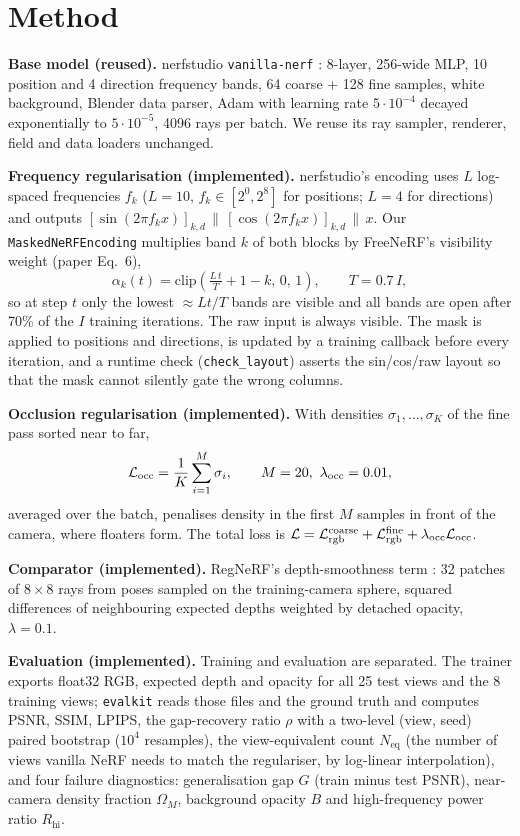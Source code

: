 \section{Method}
\textbf{Base model (reused).} nerfstudio \texttt{vanilla-nerf} \cite{tancik2023nerfstudio}: 8-layer, 256-wide MLP, 10 position and 4 direction frequency bands, 64 coarse + 128 fine samples, white background, Blender data parser, Adam with learning rate $5\cdot10^{-4}$ decayed exponentially to $5\cdot10^{-5}$, 4096 rays per batch. We reuse its ray sampler, renderer, field and data loaders unchanged.

\textbf{Frequency regularisation (implemented).} nerfstudio's encoding uses $L$ log-spaced frequencies $f_k$ ($L=10$, $f_k\in[2^0,2^8]$ for positions; $L=4$ for directions) and outputs $[\sin(2\pi f_k x)]_{k,d}\,\|\,[\cos(2\pi f_k x)]_{k,d}\,\|\,x$. Our \texttt{MaskedNeRFEncoding} multiplies band $k$ of both blocks by FreeNeRF's visibility weight (paper Eq.~6),
\begin{equation}
\alpha_k(t)=\mathrm{clip}\!\left(\tfrac{L\,t}{T}+1-k,\,0,\,1\right),\qquad T=0.7\,I,
\end{equation}
so at step $t$ only the lowest $\approx Lt/T$ bands are visible and all bands are open after 70\% of the $I$ training iterations. The raw input is always visible. The mask is applied to positions and directions, is updated by a training callback before every iteration, and a runtime check (\texttt{check\_layout}) asserts the sin/cos/raw layout so that the mask cannot silently gate the wrong columns.

\textbf{Occlusion regularisation (implemented).} With densities $\sigma_1,\dots,\sigma_K$ of the fine pass sorted near to far,
\begin{equation}
\mathcal{L}_\text{occ}=\frac{1}{K}\sum_{i=1}^{M}\sigma_i ,\qquad M=20,\ \lambda_\text{occ}=0.01,
\end{equation}
averaged over the batch, penalises density in the first $M$ samples in front of the camera, where floaters form. The total loss is $\mathcal{L}=\mathcal{L}_\text{rgb}^\text{coarse}+\mathcal{L}_\text{rgb}^\text{fine}+\lambda_\text{occ}\mathcal{L}_\text{occ}$.

\textbf{Comparator (implemented).} RegNeRF's depth-smoothness term \cite{niemeyer2022regnerf}: 32 patches of $8\times8$ rays from poses sampled on the training-camera sphere, squared differences of neighbouring expected depths weighted by detached opacity, $\lambda=0.1$.

\textbf{Evaluation (implemented).} Training and evaluation are separated. The trainer exports float32 RGB, expected depth and opacity for all 25 test views and the 8 training views; \texttt{evalkit} reads those files and the ground truth and computes PSNR, SSIM, LPIPS, the gap-recovery ratio $\rho$ with a two-level (view, seed) paired bootstrap ($10^4$ resamples), the view-equivalent count $N_\text{eq}$ (the number of views vanilla NeRF needs to match the regulariser, by log-linear interpolation), and four failure diagnostics: generalisation gap $G$ (train minus test PSNR), near-camera density fraction $\Omega_M$, background opacity $B$ and high-frequency power ratio $R_\text{hi}$.
